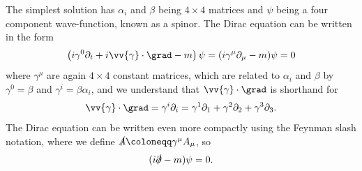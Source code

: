 \documentclass[fleqn]{NotesClass}
\begin{document}
    The simplest solution has \(\alpha_i\) and \(\beta\) being \(4 \times 4\) matrices and \(\psi\) being a four component wave-function, known as a spinor.
    The Dirac equation can be written in the form
    \begin{equation}
        \left( i\gamma^0\partial_t + i\vv{\gamma}\cdot\grad - m \right)\psi = (i\gamma^\mu\partial_\mu - m)\psi = 0
    \end{equation}
    where \(\gamma^\mu\) are again \(4\times 4\) constant matrices, which are related to \(\alpha_i\) and \(\beta\) by \(\gamma^0 = \beta\) and \(\gamma^i = \beta\alpha_i\), and we understand that \(\vv{\gamma}\cdot\grad\) is shorthand for
    \begin{equation}
        \vv{\gamma}\cdot\grad = \gamma^i\partial_i = \gamma^1\partial_1 + \gamma^2\partial_2 + \gamma^3\partial_3.
    \end{equation}
    The Dirac equation can be written even more compactly using the Feynman slash notation, where we define \(\slashed{A} \coloneqq \gamma^\mu A_\mu\), so
    \begin{equation}
        (i\slashed{\partial} - m)\psi = 0.
    \end{equation}
\end{document}
